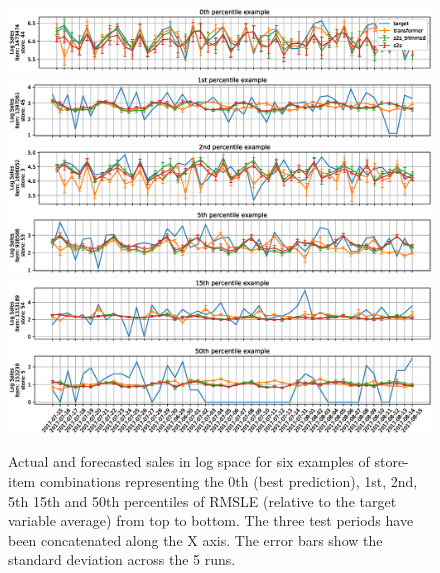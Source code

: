 \begin{figure}
	\centering
	\includegraphics[width=1\linewidth]{salesforecast/images/sample_0_log}
	\includegraphics[width=1\linewidth]{salesforecast/images/sample_1_log}
	\includegraphics[width=1\linewidth]{salesforecast/images/sample_2_log}
	\includegraphics[width=1\linewidth]{salesforecast/images/sample_3_log}
	\includegraphics[width=1\linewidth]{salesforecast/images/sample_4_log}
	\includegraphics[width=1\linewidth]{salesforecast/images/sample_5_log}
\caption{Actual and forecasted sales in log space for six examples of store-item combinations representing the 0th (best prediction), 1st, 2nd, 5th 15th and 50th percentiles of RMSLE (relative to the target variable average) from top to bottom. The three test periods have been concatenated along the X axis. The error bars show the standard deviation across the 5 runs.}
	\label{fig:ts_log}
\end{figure}

